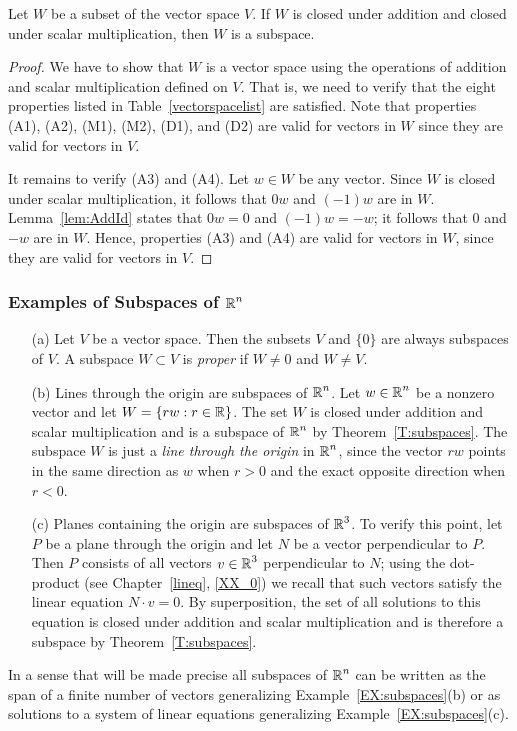 \documentclass{ximera}
\begin{document}
\begin{theorem}  \label{T:subspaces}
Let $W$ be a subset of the vector space $V$. If $W$ is closed under addition 
and closed under scalar multiplication, then $W$ is a subspace.
\end{theorem}
\begin{proof}  We have to show that $W$ is a vector space using the operations 
of addition and scalar multiplication defined on $V$.  That is, we need to
verify that the eight properties listed in Table~\ref{vectorspacelist} are 
satisfied.  Note that properties (A1), (A2), (M1), (M2), (D1), and (D2) are 
valid for vectors in $W$ since they are valid for vectors in $V$.

It remains to verify (A3) and (A4).  Let $w\in W$ be any vector.
Since $W$ is closed under scalar multiplication, it follows that
$0w$ and $(-1)w$ are in $W$. Lemma~\ref{lem:AddId} states that
$0w=0$ and $(-1)w=-w$; it follows that $0$ and $-w$ are in $W$.
Hence, properties (A3) and (A4) are valid for vectors in $W$,
since they are valid for vectors in $V$.  \end{proof}

\subsubsection*{Examples of Subspaces of $\mbox{$\Bbb{R}$}^n$}

\begin{example}  \label{EX:subspaces}
{\rm
\begin{itemize}
\item[(a)] Let $V$ be a vector space.  Then the subsets $V$ and $\{0\}$ are
always subspaces of $V$.  A subspace $W\subset V$ is {\em proper\/} if
$W\neq 0$ and $W\neq V$. 
\item[(b)] Lines through the origin are subspaces of $\mbox{$\Bbb{R}$}^n$.  Let $w\in \mbox{$\Bbb{R}$}^n$
be a nonzero vector and let $W=\{rw:r\in\mbox{$\Bbb{R}$}\}$.  The set $W$ is closed under
addition and scalar multiplication and is a subspace of $\mbox{$\Bbb{R}$}^n$ by 
Theorem~\ref{T:subspaces}.
The subspace $W$ is just a {\em line through the origin\/} in $\mbox{$\Bbb{R}$}^n$, since
the vector $rw$ points in the same direction as $w$ when $r>0$ and the exact
opposite direction when $r<0$.
\item[(c)]  Planes containing the origin are subspaces of $\mbox{$\Bbb{R}$}^3$.  To verify
this point, let $P$ be a plane through the origin and let $N$ be a vector
perpendicular to $P$.  Then $P$ consists of all vectors
$v\in\mbox{$\Bbb{R}$}^3$ perpendicular to $N$; using the dot-product (see Chapter~\ref{lineq},
\eqref{XX_0}) we recall that such vectors satisfy the linear equation
$N\cdot v = 0$.  By superposition, the set of all
solutions to this equation is closed under addition and scalar multiplication
and is therefore a subspace by Theorem~\ref{T:subspaces}.
\end{itemize}
}
\end{example}
In a sense that will be made precise all subspaces of $\mbox{$\Bbb{R}$}^n$ can be written
as the span of a finite number of vectors generalizing
Example~\ref{EX:subspaces}(b) or as solutions to a system of linear equations
generalizing Example~\ref{EX:subspaces}(c).
\end{document}
